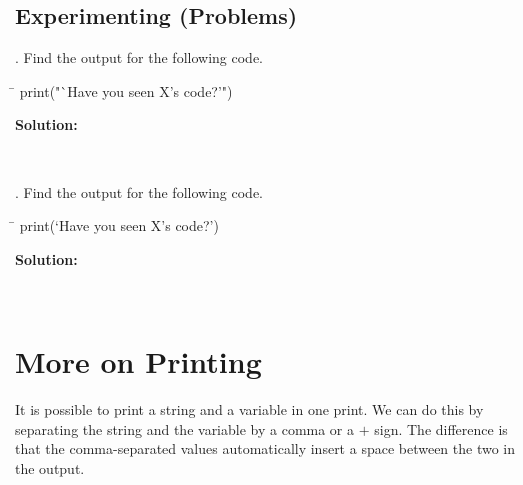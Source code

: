 \documentclass{article}
\begin{document}
\subsection{Experimenting (Problems)}
\begin{multicols}{2}
. Find the output for the following code.
\begin{tcolorbox}[width=.5\textwidth]
	\ttfamily
	\begin{tabbing}
		\hspace{3.25 in}\=\hspace{3.25 in} \kill
		print("`Have you seen X's code?'")
	\end{tabbing}
\end{tcolorbox}
\noindent\textbf{Solution:}
\begin{tcolorbox}[colback=output,width=.5\textwidth]
	\ttfamily 
	\phantom{`Have you seen X's code?'}\\
\end{tcolorbox}

. Find the output for the following code.
\begin{tcolorbox}[width=.5\textwidth]
	\ttfamily
	\begin{tabbing}
		\hspace{3.25 in}\=\hspace{3.25 in} \kill
		print(`Have you seen X's code?')
	\end{tabbing}
\end{tcolorbox}
\noindent\textbf{Solution:}
\begin{tcolorbox}[colback=output,width=.5\textwidth]
	\ttfamily 
	\phantom{error}\\
\end{tcolorbox}
\end{multicols}
\section{More on Printing}
It is possible to print a string and a variable in one print. We can do this by separating the string and the variable by a comma or a $+$ sign. The difference is that the comma-separated values automatically insert a space between the two in the output.
\end{document}
